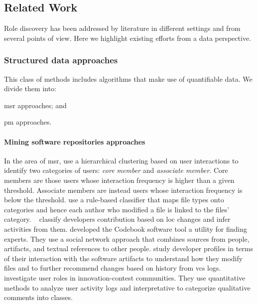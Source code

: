 \subsection{Related Work}
Role discovery has been addressed by literature in different settings and from several points of view. Here we highlight existing efforts from a data perspective.

\subsubsection{Structured data approaches}
This class of methods includes algorithms that make use of quantifiable data. We divide them into: 
\begin{inparaenum}[\itshape a)]
   \item \gls*{msr} approaches; and
   \item \gls*{pm} approaches.
\end{inparaenum}

\paragraph{\bfseries Mining software repositories approaches}
In the area of \gls*{msr}, \cite{Yu.LiguoRamaswamy.2007} use a hierarchical clustering based on user interactions to identify two categories of users: \emph{core member} and \emph{associate member}. Core members are those users whose interaction frequency is higher than a given threshold. Associate members are instead users whose interaction frequency is below the threshold.
\cite{Alonso2008} use a rule-based classifier that maps file types onto categories and hence each author who modified a file is linked to the files' category. ~\cite{gousios2008measuring} classify developers contribution based on \gls*{loc} changes and infer activities from them. \cite{Begel2010} developed the Codebook software tool a utility for finding experts. They use a social network approach that combines sources from people, artifacts, and textual references to other people. 
\cite{Ying2014} study developer profiles in terms of their interaction with the software artifacts to understand how they modify files and to further recommend changes based on history from \gls*{vcs} logs. \cite{Fuller2014a} investigate user roles in innovation-contest communities. They use quantitative methods to analyze user activity logs and interpretative to categorize qualitative comments into classes. 

